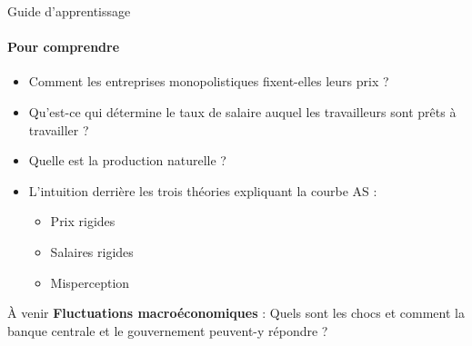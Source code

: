 \documentclass[
  ignorenonframetext,
  aspectratio=169,
]{beamer}
\providecommand{\tightlist}{%
  \setlength{\itemsep}{0pt}\setlength{\parskip}{0pt}}\usepackage{longtable,booktabs,array}
\begin{document}
\begin{frame}{Guide d'apprentissage}
\label{guide-dapprentissage}
\framesubtitle{Pour comprendre}

\begin{itemize}
\tightlist
\item
  Comment les entreprises monopolistiques fixent-elles leurs prix ?
\item
  Qu'est-ce qui détermine le taux de salaire auquel les travailleurs
  sont prêts à travailler ?
\item
  Quelle est la production naturelle ?
\item
  L'intuition derrière les trois théories expliquant la courbe AS :

  \begin{itemize}
  \tightlist
  \item
    Prix rigides
  \item
    Salaires rigides
  \item
    Misperception
  \end{itemize}
\end{itemize}
\end{frame}

\begin{frame}{À venir}
\label{uxe0-venir}
\textbf{Fluctuations macroéconomiques} : Quels sont les chocs et comment
la banque centrale et le gouvernement peuvent-y répondre ?
\end{frame}
\end{document}
